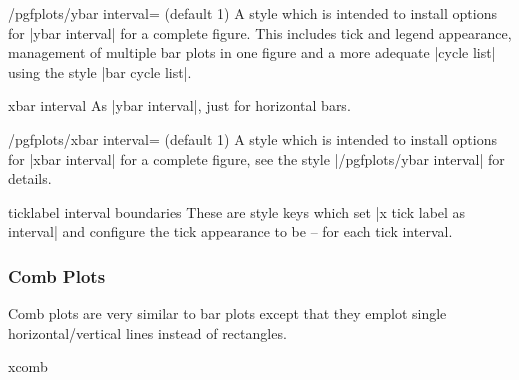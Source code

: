 \begin{stylekey}{/pgfplots/ybar interval= (default 1)}
	A style which is intended to install options for |ybar interval| for a complete figure. This includes tick and legend appearance, management of multiple bar plots in one figure and a more adequate |cycle list| using the style |bar cycle list|.
\end{stylekey}

\begin{plottype}{xbar interval}
	As |ybar interval|, just for horizontal bars. 
\begin{codeexample}[]
\end{codeexample}
\end{plottype}

\begin{stylekey}{/pgfplots/xbar interval= (default 1)}
	A style which is intended to install options for |xbar interval| for a complete figure, see the style |/pgfplots/ybar interval| for details.
\end{stylekey}

\begin{pgfplotsxykey}{\x ticklabel interval boundaries}
	These are style keys which set |x tick label as interval| and configure the tick appearance to be  --  for each tick interval.
\end{pgfplotsxykey}

\subsubsection{Comb Plots}
Comb plots are very similar to bar plots except that they emplot single horizontal/vertical lines instead of rectangles.

\begin{plottype}{xcomb}
\begin{codeexample}[]
\end{codeexample}
\end{plottype}

